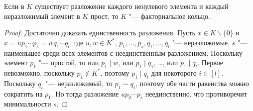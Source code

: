 \begin{proposition}
	Если в $K$ существует разложение каждого ненулевого элемента и каждый неразложимый элемент в $K$ прост, то $K$ "--- факториальное кольцо.
\end{proposition}

\begin{proof}
	Достаточно доказать единственность разложения. Пусть $x \in K\backslash\{0\}$ и $x = up_1\dotsm p_s = wq_1\dotsm q_l$, где $u, w \in K^*$, $p_1, \dotsc, p_s, q_1, \dotsc, q_l$ "--- неразложимые, $s$ "--- наименьшее среди всех элементов с неединственным разложением. Поскольку элемент $p_1$ "--- простой, то или $p_1\mid w$, или $p_1 \mid q_1$, \dots, или $p_1 \mid q_l$. Первое невозможно, поскольку $p_1 \not\in K^*$, поэтому $p_1 \mid q_i$ для некоторого $i \in [l]$. Поскольку $q_i$ "--- неразложимый, то $p_1 \sim q_i$, поэтому обе части равенства можно сократить на $p_1$. Но тогда разложение $up_2\dotsm p_s$ неединственно, что противоречит минимальности $s$.
\end{proof}